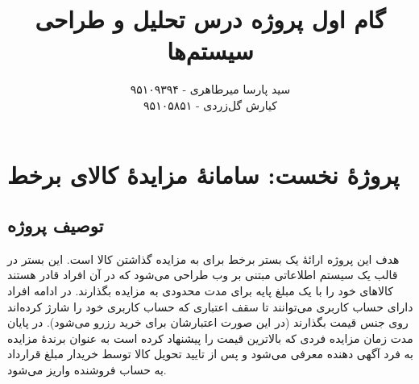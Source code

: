\documentclass{article}
\title{\textbf{گام اول پروژه درس تحلیل و طراحی سیستم‌ها}}
\author{سید پارسا میرطاهری - ۹۵۱۰۹۳۹۴ \\ کیارش گل‌زردی - ۹۵۱۰۵۸۵۱}
\begin{document}
\date{}

\maketitle

\section{پروژهٔ نخست: سامانهٔ مزایدهٔ کالای برخط}

\subsection{توصیف پروژه}

هدف این پروژه ارائهٔ یک بستر برخط برای به مزایده گذاشتن کالا است. این بستر در قالب یک سیستم اطلاعاتی مبتنی بر وب طراحی می‌شود که در آن افراد قادر هستند کالاهای خود را با یک مبلغ پایه برای مدت محدودی به مزایده بگذارند. در ادامه افراد دارای حساب کاربری می‌توانند تا سقف اعتباری که حساب کاربری خود را شارژ کرده‌اند روی جنس قیمت بگذارند (در این صورت اعتبارشان برای خرید رزرو می‌شود). در پایان مدت زمان مزایده فردی که بالاترین قیمت را پیشنهاد کرده است به عنوان برندهٔ مزایده به فرد آگهی دهنده معرفی می‌شود و پس از تایید تحویل کالا توسط خریدار مبلغ قرارداد به حساب فروشنده واریز می‌شود.

\subsection{}
\end{document}
